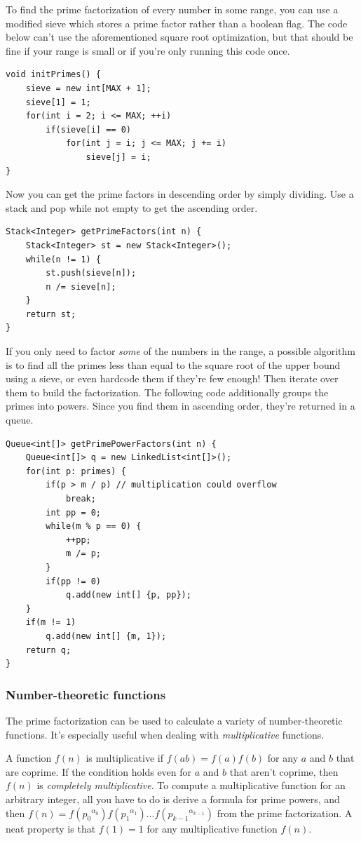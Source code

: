 \documentclass[a4paper,12pt]{article}
\begin{document}
To find the prime factorization of every number in some range, you can use a modified sieve which stores a prime factor rather than a boolean flag. The code below can't use the aforementioned square root optimization, but that should be fine if your range is small or if you're only running this code once.

\begin{lstlisting}
void initPrimes() {
	sieve = new int[MAX + 1];
	sieve[1] = 1;
	for(int i = 2; i <= MAX; ++i)
		if(sieve[i] == 0)
			for(int j = i; j <= MAX; j += i)
				sieve[j] = i;
}
\end{lstlisting}

\noindent Now you can get the prime factors in descending order by simply dividing. Use a stack and pop while not empty to get the ascending order.

\begin{lstlisting}
Stack<Integer> getPrimeFactors(int n) {
	Stack<Integer> st = new Stack<Integer>();
	while(n != 1) {
		st.push(sieve[n]);
		n /= sieve[n];
	}
	return st;
}
\end{lstlisting}

\noindent If you only need to factor {\em some} of the numbers in the range, a possible algorithm is to find all the primes less than equal to the square root of the upper bound using a sieve, or even hardcode them if they're few enough! Then iterate over them to build the factorization. The following code additionally groups the primes into powers. Since you find them in ascending order, they're returned in a queue.

\begin{lstlisting}
Queue<int[]> getPrimePowerFactors(int n) {
	Queue<int[]> q = new LinkedList<int[]>();
	for(int p: primes) {
		if(p > m / p) // multiplication could overflow
			break;
		int pp = 0;
		while(m % p == 0) {
			++pp;
			m /= p;
		}
		if(pp != 0)
			q.add(new int[] {p, pp});
	}
	if(m != 1)
		q.add(new int[] {m, 1});
	return q;
}
\end{lstlisting}

\subsubsection{Number-theoretic functions}

The prime factorization can be used to calculate a variety of number-theoretic functions. It's especially useful when dealing with {\em multiplicative} functions.

A function $f(n)$ is multiplicative if $f(ab)=f(a)f(b)$ for any $a$ and $b$ that are coprime. If the condition holds even for $a$ and $b$ that aren't coprime, then $f(n)$ is {\em completely multiplicative}. To compute a multiplicative function for an arbitrary integer, all you have to do is derive a formula for prime powers, and then $f(n)=f({p_0}^{\alpha_0})f({p_1}^{\alpha_1})\ldots f({p_{k-1}}^{\alpha_{k-1}})$ from the prime factorization. A neat property is that $f(1)=1$ for any multiplicative function $f(n)$. 
\end{document}
